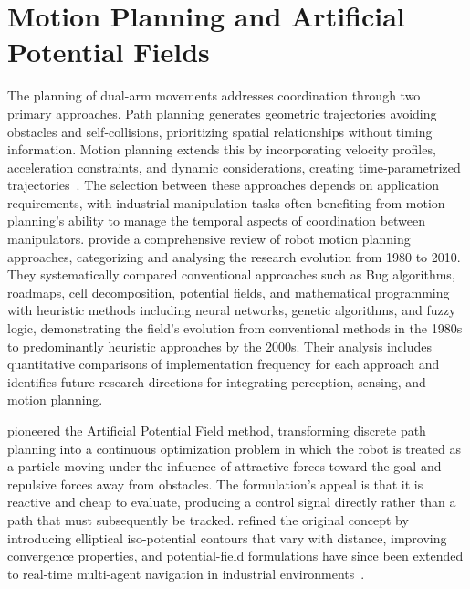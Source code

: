 \section{Motion Planning and Artificial Potential Fields}\label{sec:lit_planning}

The planning of dual-arm movements addresses coordination through two primary approaches. Path
planning generates geometric trajectories avoiding obstacles and self-collisions, prioritizing
spatial relationships without timing information. Motion planning extends this by incorporating
velocity profiles, acceleration constraints, and dynamic considerations, creating time-parametrized
trajectories~\citep{abbas2023systematic}. The selection between these approaches depends on
application requirements, with industrial manipulation tasks often benefiting from motion planning's
ability to manage the temporal aspects of coordination between manipulators. \citet{tang2012review} provide a comprehensive review of robot motion planning approaches, categorizing and analysing the research evolution from 1980 to 2010. They systematically compared conventional approaches such as Bug algorithms, roadmaps, cell decomposition, potential fields, and mathematical programming with heuristic methods including neural networks, genetic algorithms, and fuzzy logic, demonstrating the field's evolution from conventional methods in the 1980s to predominantly heuristic approaches by the 2000s. Their analysis includes quantitative comparisons of implementation frequency for each approach and identifies future research directions for integrating perception, sensing, and motion planning.

\citet{khatib1986real} pioneered the Artificial Potential Field method, transforming discrete path
planning into a continuous optimization problem in which the robot is treated as a particle moving
under the influence of attractive forces toward the goal and repulsive forces away from obstacles.
The formulation's appeal is that it is reactive and cheap to evaluate, producing a control signal
directly rather than a path that must subsequently be tracked. \citet{volpe1987artificial} refined
the original concept by introducing elliptical iso-potential contours that vary with distance,
improving convergence properties, and potential-field formulations have since been extended to
real-time multi-agent navigation in industrial environments~\citep{prajapati2026mppf}.

